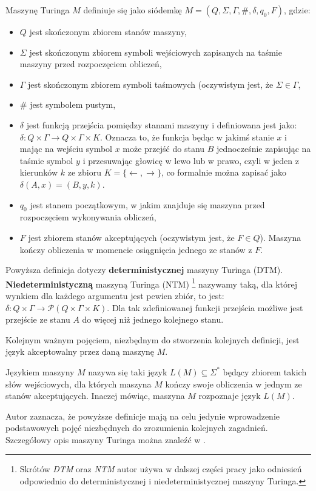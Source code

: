 \begin{definition}
Maszynę Turinga $M$ definiuje się jako siódemkę $M = (Q, \Sigma, \Gamma, \#, \delta, q_{0}, F)$, gdzie:
\begin{itemize}
    \item $Q$ jest skończonym zbiorem stanów maszyny,
    \item $\Sigma$ jest skończonym zbiorem symboli wejściowych zapisanych na taśmie maszyny przed rozpoczęciem obliczeń,
    \item $\Gamma$ jest skończonym zbiorem symboli taśmowych (oczywistym jest, że $\Sigma \in \Gamma$,
    \item $\#$ jest symbolem pustym,
    \item $\delta$ jest funkcją przejścia pomiędzy stanami maszyny i definiowana jest jako: $\delta: Q \times \Gamma \rightarrow Q \times \Gamma \times K$. Oznacza to, że funkcja będąc w jakimś stanie $x$ i mając na wejściu symbol $x$ może przejść do stanu $B$ jednocześnie zapisując na taśmie symbol $y$ i przesuwając głowicę w lewo lub w prawo, czyli w jeden z kierunków $k$ ze zbioru $K = \lbrace \leftarrow, \rightarrow \rbrace$, co formalnie można zapisać jako $\delta(A, x) = (B, y, k)$.
    \item $q_{0}$ jest stanem początkowym, w jakim znajduje się maszyna przed rozpoczęciem wykonywania obliczeń, 
    \item $F$ jest zbiorem stanów akceptujących (oczywistym jest, że $F \in Q$). Maszyna kończy obliczenia w momencie osiągnięcia jednego ze stanów z $F$. 
\end{itemize}

Powyższa definicja dotyczy \textbf{deterministycznej} maszyny Turinga (DTM). \textbf{Niedeterministyczną} maszyną Turinga (NTM) \footnote{Skrótów \textit{DTM} oraz \textit{NTM} autor używa w dalszej części pracy jako odniesień odpowiednio do deterministycznej i niedeterministycznej maszyny Turinga.} nazywamy taką, dla której wynkiem dla każdego argumentu jest pewien zbiór, to jest: $\delta: Q \times \Gamma \rightarrow \mathcal{P}(Q \times \Gamma \times K)$. Dla tak zdefiniowanej funkcji przejścia możliwe jest przejście ze stanu $A$ do więcej niż jednego kolejnego stanu.
\end{definition}

Kolejnym ważnym pojęciem, niezbędnym do stworzenia kolejnych definicji, jest język akceptowalny przez daną maszynę $M$.

\begin{definition}
Językiem maszyny $M$ nazywa się taki język $L(M) \subseteq \Sigma^{*}$ będący zbiorem takich słów wejściowych, dla których maszyna $M$ kończy swoje obliczenia w jednym ze stanów akceptujących. Inaczej mówiąc, maszyna $M$ rozpoznaje język $L(M)$.
\end{definition}
Autor zaznacza, że powyższe definicje mają na celu jedynie wprowadzenie podstawowych pojęć niezbędnych do zrozumienia kolejnych zagadnień. Szczegółowy opis maszyny Turinga można znaleźć w \cite{ZlozonoscObliczeniowa, WazniakZlozonosc}.

